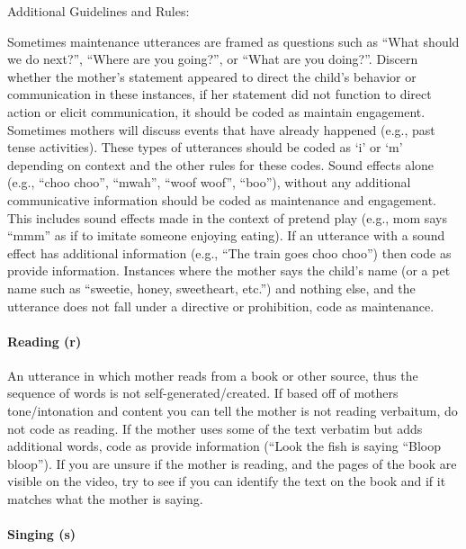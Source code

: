 \documentclass[
]{book}
\begin{document}
Additional Guidelines and Rules:

Sometimes maintenance utterances are framed as questions such as ``What should we do next?'', ``Where are you going?'', or ``What are you doing?''. Discern whether the mother's statement appeared to direct the child's behavior or communication in these instances, if her statement did not function to direct action or elicit communication, it should be coded as maintain engagement.
Sometimes mothers will discuss events that have already happened (e.g., past tense activities). These types of utterances should be coded as `i' or `m' depending on context and the other rules for these codes.
Sound effects alone (e.g., ``choo choo'', ``mwah'', ``woof woof'', ``boo''), without any additional communicative information should be coded as maintenance and engagement. This includes sound effects made in the context of pretend play (e.g., mom says ``mmm'' as if to imitate someone enjoying eating). If an utterance with a sound effect has additional information (e.g., ``The train goes choo choo'') then code as provide information.
Instances where the mother says the child's name (or a pet name such as ``sweetie, honey, sweetheart, etc.'') and nothing else, and the utterance does not fall under a directive or prohibition, code as maintenance.

\hypertarget{reading}{%
\paragraph*{Reading (r)}\label{reading}}

An utterance in which mother reads from a book or other source, thus the sequence of words is not self-generated/created. If based off of mothers tone/intonation and content you can tell the mother is not reading verbaitum, do not code as reading. If the mother uses some of the text verbatim but adds additional words, code as provide information (``Look the fish is saying ``Bloop bloop'').
If you are unsure if the mother is reading, and the pages of the book are visible on the video, try to see if you can identify the text on the book and if it matches what the mother is saying.

\hypertarget{singing}{%
\paragraph*{Singing (s)}\label{singing}}
\end{document}
